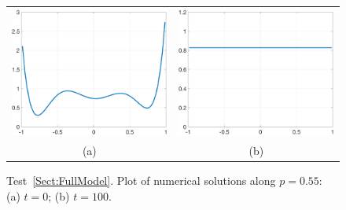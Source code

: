 \documentclass[preprint,11pt]{elsarticle}
\begin{document}
\begin{figure}[H]
\centering
\begin{tabular}{cc}
\includegraphics[width=.45\textwidth]{./NumFig/FullModel2D-3-1-cross}
&\includegraphics[width=.45\textwidth]{./NumFig/FullModel2D-3-100-cross}\\
(a)&(b)
\end{tabular}
\caption{Test~\ref{Sect:FullModel}. Plot of numerical solutions along $p = 0.55$: (a) $t = 0$; (b) $t=100$.}
\end{figure}

%
%
\end{document}
